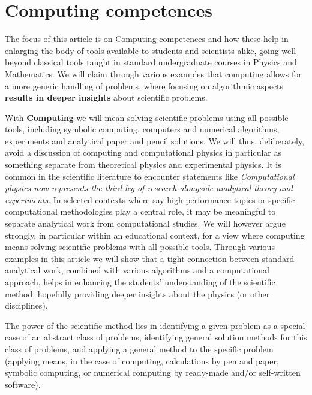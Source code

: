 \documentclass[graybox,envcountchap,sectrefs]{svmult}
\begin{document}
\section{Computing competences}

The focus of this article is on Computing competences and how
these help in enlarging the body of tools available to students and
scientists alike, going well beyond classical tools taught in standard
undergraduate courses in Physics and Mathematics. We will claim through various
examples that computing allows for a more generic handling of
problems, where focusing on algorithmic aspects \textbf{results in deeper
insights} about scientific problems.

With \textbf{Computing} we will mean solving scientific problems using all
possible tools, including symbolic computing, computers and numerical
algorithms, experiments and analytical paper and pencil solutions. We
will thus, deliberately, avoid a discussion of computing and
computational physics in particular as something separate from
theoretical physics and experimental physics.  It is common in the
scientific literature to encounter statements like \emph{Computational
physics now represents the third leg of research alongside analytical
theory and experiments}. In selected contexts where say
high-performance topics or specific computational methodologies play a
central role, it may be meaningful to separate analytical work from
computational studies. We will however argue strongly, in particular within an educational context,  
for a view where
computing means solving scientific problems with all possible
tools. Through various examples in this article we will show that a
tight connection between standard analytical work, combined with
various algorithms and a computational approach, helps in enhancing the
students' understanding of the scientific method, hopefully providing
deeper insights about the physics (or other disciplines).

The power of the scientific method lies in identifying a given problem
as a special case of an abstract class of problems, identifying
general solution methods for this class of problems, and applying a
general method to the specific problem (applying means, in the case of
computing, calculations by pen and paper, symbolic computing, or
numerical computing by ready-made and/or self-written software). 
\end{document}
